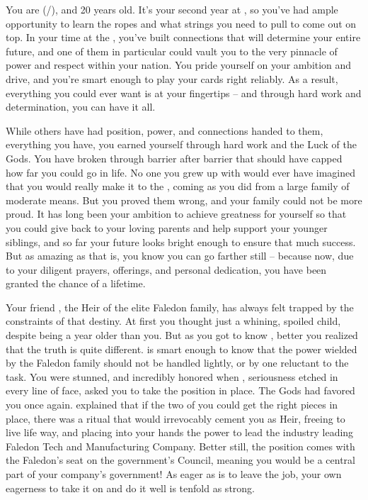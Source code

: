 \documentclass[char]{GL2020}
\begin{document}
\name{\cAmbition{}}


You are \cAmbition{} (\cAmbition{\they}/\cAmbition{\them}), and 20 years old. It’s your second year at \pSchool{}, so you’ve had ample opportunity to learn the ropes and what strings you need to pull to come out on top. In your time at the \pSc{}, you’ve built connections that will determine your entire future, and one of them in particular could vault you to the very pinnacle of power and respect within your nation. You pride yourself on your ambition and drive, and you’re smart enough to play your cards right reliably. As a result, everything you could ever want is at your fingertips -- and through hard work and determination, you can have it all.

While others have had position, power, and connections handed to them, everything you have, you earned yourself through hard work and the Luck of the Gods. You have broken through barrier after barrier that should have capped how far you could go in life. No one you grew up with would ever have imagined that you would really make it to the \pSchool{}, coming as you did from a large family of moderate means. But you proved them wrong, and your family could not be more proud.  It has long been your ambition to achieve greatness for yourself so that you could give back to your loving parents and help support your younger siblings, and so far your future looks bright enough to ensure that much success. But as amazing as that is, you know you can go farther still -- because now, due to your diligent prayers, offerings, and personal dedication, you have been granted the chance of a lifetime.

Your friend \cHeir{}, the Heir of the elite Faledon family, has always felt trapped by the constraints of that destiny. At first you thought \cHeir{\they} \cHeir{\were} just a whining, spoiled child, despite being a year older than you. But as you got to know \cHeir{\them}, better you realized that the truth is quite different. \cHeir{} is smart enough to know that the power wielded by the Faledon family should not be handled lightly, or by one reluctant to the task. You were stunned, and incredibly honored when \cHeir{}, seriousness etched in every line of \cHeir{\their} face, asked you to take the position in \cHeir{\their} place. The Gods had favored you once again. \cHeir{} explained that if the two of you could get the right pieces in place, there was a ritual that would irrevocably cement you as Heir, freeing \cHeir{\them} to live life \cHeir{\their} way, and placing into your hands the power to lead the industry leading Faledon Tech and Manufacturing Company. Better still, the position comes with the Faledon’s seat on the government’s Council, meaning you would be a central part of your company’s government! As eager as \cHeir{} is to leave the job, your own eagerness to take it on and do it well is tenfold as strong.
\end{document}
